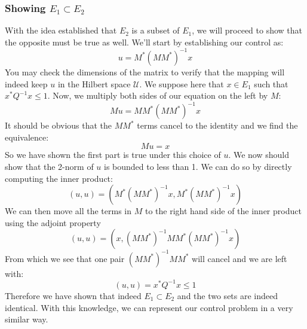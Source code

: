 \subsubsection{Showing $E_1\subset E_2$}
With the idea established that $E_2$ is a subset of $E_1$, we will proceed to show that the opposite must be true as well. We'll start by establishing our control as:
$$u=M^*(MM^*)^{-1}x$$
You may check the dimensions of the matrix to verify that the mapping will indeed keep $u$ in the Hilbert space $\mathcal{U}$. We suppose here that $x\in E_1$ such that $x^*Q^{-1}x\le1$. Now, we multiply both sides of our equation on the left by $M$:
$$Mu=MM^*(MM^*)^{-1}x$$
It should be obvious that the $MM^*$ terms cancel to the identity and we find the equivalence:
$$Mu=x$$
So we have shown the first part is true under this choice of $u$. We now should show that the 2-norm of $u$ is bounded to less than 1. We can do so by directly computing the inner product:
$$(u,u)=(M^*(MM^*)^{-1}x,M^*(MM^*)^{-1}x)$$
We can then move all the terms in $M$ to the right hand side of the inner product using the adjoint property
$$(u,u)=(x,(MM^*)^{-1}MM^*(MM^*)^{-1}x)$$
From which we see that one pair $(MM^*)^{-1}MM^*$ will cancel and we are left with:
$$(u,u)=x^*Q^{-1}x\le1$$
Therefore we have shown that indeed $E_1\subset E_2$ and the two sets are indeed identical. With this knowledge, we can represent our control problem in a very similar way.

